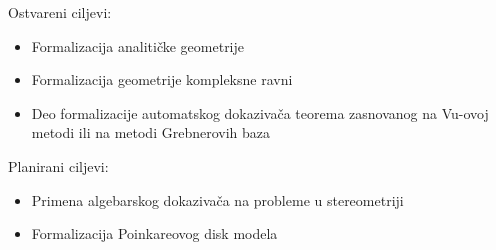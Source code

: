 \documentclass{beamer}
\begin{document}
\begin{frame}
Ostvareni ciljevi:
\begin{itemize}
\item Formalizacija analiti\v cke geometrije
\item Formalizacija geometrije kompleksne ravni
\item Deo formalizacije automatskog dokaziva\v ca teorema zasnovanog na Vu-ovoj metodi ili na metodi 
Grebnerovih baza 
\end{itemize}

Planirani ciljevi:
\begin{itemize}
\item Primena algebarskog dokaziva\v ca na probleme u stereometriji
\item Formalizacija Poinkareovog disk modela
\end{itemize}
\end{frame}
\end{document}
